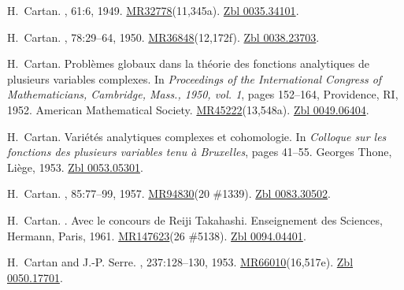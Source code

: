 \documentclass[11pt,a4paper, final, twoside]{article}
\numberwithin{equation}{section}
\begin{document}
\begin{appendices}
\begin{thebibliography}{100}
H.~Cartan.
, 61:6,
  1949.
\newblock
  \href{http://www.ams.org/mathscinet-getitem?mr=32778}{MR32778}(11,345a).
  \href{http://zbmath.org/?q=an:0035.34101}{Zbl 0035.34101}.

H.~Cartan.
,
  78:29--64, 1950.
\newblock
  \href{http://www.ams.org/mathscinet-getitem?mr=36848}{MR36848}(12,172f).
  \href{http://zbmath.org/?q=an:0038.23703}{Zbl 0038.23703}.

H.~Cartan.
\newblock Probl\`emes globaux dans la th\'eorie des fonctions analytiques de
  plusieurs variables complexes.
\newblock In {\em Proceedings of the {I}nternational {C}ongress of
  {M}athematicians, {C}ambridge, {M}ass., 1950, vol. 1}, pages 152--164,
  Providence, RI, 1952. American Mathematical Society.
\newblock
  \href{http://www.ams.org/mathscinet-getitem?mr=45222}{MR45222}(13,548a).
  \href{http://zbmath.org/?q=an:0049.06404}{Zbl 0049.06404}.

H.~Cartan.
\newblock Vari\'et\'es analytiques complexes et cohomologie.
\newblock In {\em Colloque sur les fonctions des plusieurs variables tenu {\`a}
  Bruxelles}, pages 41--55. Georges Thone, Li\`ege, 1953.
\newblock \href{http://zbmath.org/?q=an:0053.05301}{Zbl 0053.05301}.

H.~Cartan.
,
  85:77--99, 1957.
\newblock \href{http://www.ams.org/mathscinet-getitem?mr=94830}{MR94830}(20
  \#1339). \href{http://zbmath.org/?q=an:0083.30502}{Zbl 0083.30502}.

H.~Cartan.
.
\newblock Avec le concours de Reiji Takahashi. Enseignement des Sciences,
  Hermann, Paris, 1961.
\newblock \href{http://www.ams.org/mathscinet-getitem?mr=147623}{MR147623}(26
  \#5138). \href{http://zbmath.org/?q=an:0094.04401}{Zbl 0094.04401}.

H.~Cartan and J.-P. Serre.
, 237:128--130, 1953.
\newblock
  \href{http://www.ams.org/mathscinet-getitem?mr=66010}{MR66010}(16,517e).
  \href{http://zbmath.org/?q=an:0050.17701}{Zbl 0050.17701}.


\end{thebibliography}
\end{appendices}
\end{document}
